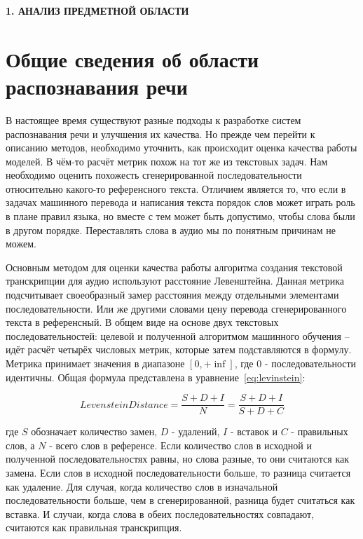 \newpage
\begin{center}
  \textbf{\large 1. АНАЛИЗ ПРЕДМЕТНОЙ ОБЛАСТИ}
\end{center}


\section{Общие сведения об области распознавания речи}

В настоящее время существуют разные подходы к разработке систем распознавания речи и улучшения их качества.
Но прежде чем перейти к описанию методов, необходимо уточнить, как происходит оценка качества работы моделей.
В чём-то расчёт метрик похож на тот же из текстовых задач.
Нам необходимо оценить похожесть сгенерированной последовательности относительно какого-то референсного текста.
Отличием является то, что если в задачах машинного перевода и написания текста порядок слов может играть роль в плане правил языка, но вместе с тем может быть допустимо, чтобы слова были в другом порядке.
Переставлять слова в аудио мы по понятным причинам не можем.

Основным методом для оценки качества работы алгоритма создания текстовой транскрипции для аудио используют расстояние Левенштейна.
Данная метрика подсчитывает своеобразный замер расстояния между отдельными элементами последовательности.
Или же другими словами цену перевода сгенерированного текста в референсный.
В общем виде на основе двух текстовых последовательностей: целевой и полученной алгоритмом машинного обучения -- идёт расчёт четырёх числовых метрик, которые затем подставляются в формулу.
Метрика принимает значения в диапазоне $[0, +\inf]$, где 0 - последовательности идентичны.
Общая формула представлена в уравнение~\ref{eq:levinstein}:

\begin{equation}
  Levenstein Distance = \frac{S + D + I}{N} = \frac{S + D + I}{S + D + C}
  \label{eq:levinstein}
\end{equation}


где $S$ обозначает количество замен, $D$ - удалений, $I$ - вставок и $C$ - правильных слов, а $N$ - всего слов в референсе. 
Если количество слов в исходной и полученной последовательностях равны, но слова разные, то они считаются как замена. 
Если слов в исходной последовательности больше, то разница считается как удаление.
Для случая, когда количество слов в изначальной последовательности больше, чем в сгенерированной, разница будет считаться как вставка.
И случаи, когда слова в обеих последовательностях совпадают, считаются как правильная транскрипция.

